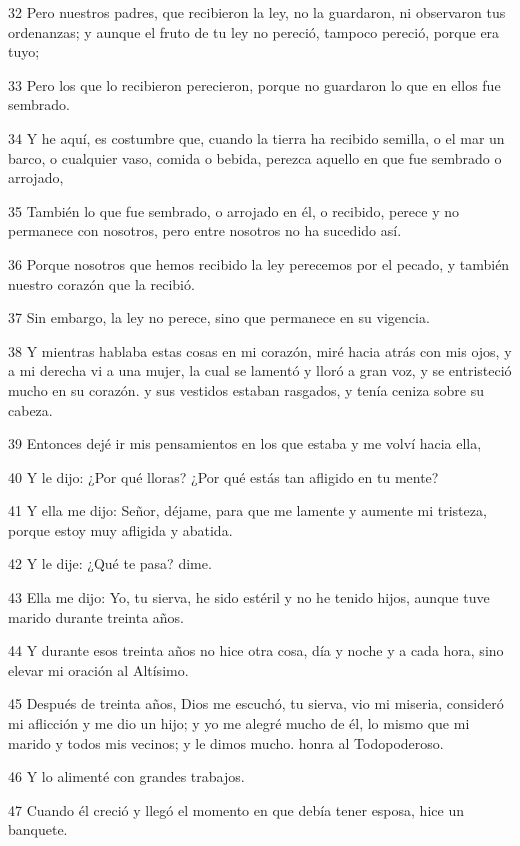 \par 32 Pero nuestros padres, que recibieron la ley, no la guardaron, ni observaron tus ordenanzas; y aunque el fruto de tu ley no pereció, tampoco pereció, porque era tuyo;
\par 33 Pero los que lo recibieron perecieron, porque no guardaron lo que en ellos fue sembrado.
\par 34 Y he aquí, es costumbre que, cuando la tierra ha recibido semilla, o el mar un barco, o cualquier vaso, comida o bebida, perezca aquello en que fue sembrado o arrojado,
\par 35 También lo que fue sembrado, o arrojado en él, o recibido, perece y no permanece con nosotros, pero entre nosotros no ha sucedido así.
\par 36 Porque nosotros que hemos recibido la ley perecemos por el pecado, y también nuestro corazón que la recibió.
\par 37 Sin embargo, la ley no perece, sino que permanece en su vigencia.
\par 38 Y mientras hablaba estas cosas en mi corazón, miré hacia atrás con mis ojos, y a mi derecha vi a una mujer, la cual se lamentó y lloró a gran voz, y se entristeció mucho en su corazón. y sus vestidos estaban rasgados, y tenía ceniza sobre su cabeza.
\par 39 Entonces dejé ir mis pensamientos en los que estaba y me volví hacia ella,
\par 40 Y le dijo: ¿Por qué lloras? ¿Por qué estás tan afligido en tu mente?
\par 41 Y ella me dijo: Señor, déjame, para que me lamente y aumente mi tristeza, porque estoy muy afligida y abatida.
\par 42 Y le dije: ¿Qué te pasa? dime.
\par 43 Ella me dijo: Yo, tu sierva, he sido estéril y no he tenido hijos, aunque tuve marido durante treinta años.
\par 44 Y durante esos treinta años no hice otra cosa, día y noche y a cada hora, sino elevar mi oración al Altísimo.
\par 45 Después de treinta años, Dios me escuchó, tu sierva, vio mi miseria, consideró mi aflicción y me dio un hijo; y yo me alegré mucho de él, lo mismo que mi marido y todos mis vecinos; y le dimos mucho. honra al Todopoderoso.
\par 46 Y lo alimenté con grandes trabajos.
\par 47 Cuando él creció y llegó el momento en que debía tener esposa, hice un banquete.

